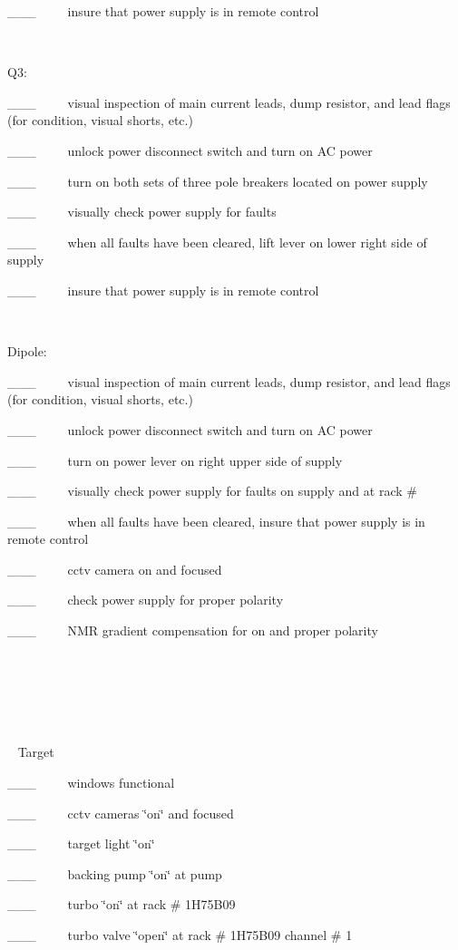 \_\_\_~~~~~insure that power supply is in remote control

~

Q3:

\_\_\_~~~~~visual inspection of main current leads, dump resistor, and lead
flags (for condition, visual shorts, etc.)

\_\_\_~~~~~unlock power disconnect switch and turn on AC power

\_\_\_~~~~~turn on both sets of three pole breakers located on power supply

\_\_\_~~~~~visually check power supply for faults

\_\_\_~~~~~when all faults have been cleared, lift lever on lower right side
of supply

\_\_\_~~~~~insure that power supply is in remote control

~

Dipole:

\_\_\_~~~~~visual inspection of main current leads, dump resistor, and lead
flags (for condition, visual shorts, etc.)

\_\_\_~~~~~unlock power disconnect switch and turn on AC power

\_\_\_~~~~~turn on power lever on right upper side of supply

\_\_\_~~~~~visually check power supply for faults on supply and at rack \#

\_\_\_~~~~~when all faults have been cleared, insure that power supply is in
remote control

\_\_\_~~~~~cctv camera on and focused

\_\_\_~~~~~check power supply for proper polarity 

\_\_\_~~~~~NMR gradient compensation for on and proper polarity

~

~

~

~ Target

\_\_\_~~~~~windows functional~~~~~~

\_\_\_~~~~~cctv cameras \char`\"{}on\char`\"{} and focused

\_\_\_~~~~~target light \char`\"{}on\char`\"{} 

\_\_\_~~~~~backing pump \char`\"{}on\char`\"{} at pump

\_\_\_~~~~~turbo \char`\"{}on\char`\"{} at rack \# 1H75B09

\_\_\_~~~~~turbo valve \char`\"{}open\char`\"{} at rack \# 1H75B09 channel \#
1

